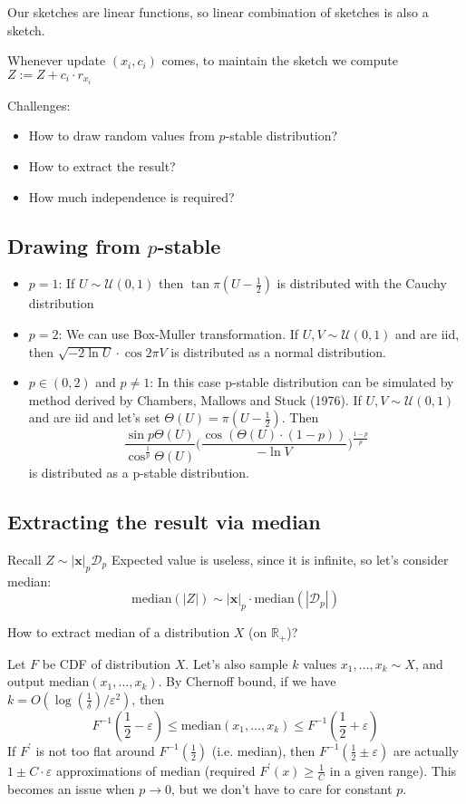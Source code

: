 \documentclass[11pt]{article}
\begin{document}
\begin{remark}
  Our sketches are linear functions, so linear combination of sketches is also a sketch.
\end{remark}


\medskip
\noindent Whenever update $(x_i, c_i)$ comes, to maintain the sketch we compute $Z := Z + c_i \cdot r_{x_i}$ 

Challenges:
\begin{itemize}
 \item How to draw random values from $p$-stable distribution?
 \item How to extract the result?
 \item How much independence is required?
\end{itemize}
\subsection{Drawing from $p$-stable}
\begin{itemize}
\item $p=1$:  If $U \sim \mathcal{U}(0,1)$ then $\tan{\pi(U - \frac{1}{2})}$ is distributed with the Cauchy distribution
\item $p = 2$:
  We can use Box-Muller transformation. If $U, V \sim \mathcal{U}(0,1)$ and are iid, then $\sqrt{-2\ln{U}}\cdot\cos{2\pi V}$ is distributed as a normal distribution.
\item $p \in (0,2)$ and $p \neq 1$:
  In this case p-stable distribution can be simulated by method derived by Chambers, Mallows and Stuck (1976). 
  If $U, V \sim \mathcal{U}(0,1)$ and are iid and let's set $\Theta(U) = \pi (U - \frac{1}{2})$. Then 
  $$
  \frac{\sin{p\Theta(U)}}{\cos^{\frac{1}{p}}{\Theta(U)}} \Bigg(\frac{\cos{(\Theta(U)\cdot (1 - p))}}{- \ln V}\Bigg)^{\frac{1-p}{p}}
  $$
  is distributed as a p-stable distribution.
\end{itemize}

\subsection{Extracting the result via median}
Recall $Z \sim |\mathbf{x}|_p \mathcal{D}_p$
Expected value is useless, since it is infinite, so let's consider median: $$\textrm{median}(|Z|) \sim |\mathbf{x}|_p \cdot \textrm{median}(|\mathcal{D}_p|)$$ 

\medskip
\noindent How to extract median of a distribution $X$ (on $\mathbb{R}_+$)? 

Let $F$ be CDF of distribution $X$. Let's also sample $k$ values $x_1,\dots,x_k \sim X$, and output $\textrm{median}(x_1,\dots,x_k)$. 
By Chernoff bound, if we have
$k = O(\log(\frac{1}{\delta})/\varepsilon^2)$, then $$F^{-1}(\frac{1}{2}-\varepsilon) \leq \textrm{median}(x_1,\dots,x_k) \leq F^{-1}(\frac{1}{2}+\varepsilon)$$
\medskip
If $F^\prime$ is not too flat around $F^{-1}(\frac{1}{2})$ (i.e. median), then $F^{-1}(\frac{1}{2} \pm \varepsilon)$ are actually $1\pm C\cdot\varepsilon$ approximations of median (required $F^\prime(x) \geq \frac{1}{C}$ in a given range). This becomes an issue when $p \rightarrow 0$, but we don't have to care for constant $p$.
\end{document}
